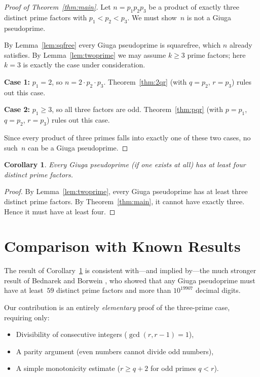 \documentclass[12pt,a4paper]{amsart}
\newtheorem{corollary}[theorem]{Corollary}
\theoremstyle{definition}
\begin{document}
\begin{proof}[Proof of Theorem~\ref{thm:main}]
Let $n = p_1 p_2 p_3$ be a product of exactly three distinct prime factors
with $p_1 < p_2 < p_3$.  We must show~$n$ is not a Giuga pseudoprime.

By Lemma~\ref{lem:sqfree} every Giuga pseudoprime is squarefree, which $n$
already satisfies.  By Lemma~\ref{lem:twoprime} we may assume $k \ge 3$ prime
factors; here $k = 3$ is exactly the case under consideration.

\textbf{Case 1:} $p_1 = 2$, so $n = 2 \cdot p_2 \cdot p_3$.
Theorem~\ref{thm:2qr} (with $q = p_2$, $r = p_3$) rules out this case.

\textbf{Case 2:} $p_1 \ge 3$, so all three factors are odd.
Theorem~\ref{thm:pqr} (with $p = p_1$, $q = p_2$, $r = p_3$) rules out
this case.

Since every product of three primes falls into exactly one of these two cases,
no such~$n$ can be a Giuga pseudoprime.
\end{proof}

\begin{corollary}
\label{cor:fourprimes}
Every Giuga pseudoprime (if one exists at all) has at least \emph{four}
distinct prime factors.
\end{corollary}

\begin{proof}
By Lemma~\ref{lem:twoprime}, every Giuga pseudoprime has at least three
distinct prime factors.  By Theorem~\ref{thm:main}, it cannot have exactly
three.  Hence it must have at least four.
\end{proof}

\section{Comparison with Known Results}

The result of Corollary~\ref{cor:fourprimes} is consistent with—and implied
by—the much stronger result of Bednarek and Borwein \cite{Bednarek2014}, who
showed that any Giuga pseudoprime must have at least~$59$ distinct prime
factors and more than $10^{19907}$ decimal digits.

Our contribution is an entirely \emph{elementary} proof of the three-prime
case, requiring only:
\begin{itemize}
  \item Divisibility of consecutive integers ($\gcd(r, r-1) = 1$),
  \item A parity argument (even numbers cannot divide odd numbers),
  \item A simple monotonicity estimate ($r \ge q + 2$ for odd primes $q < r$).
\end{itemize}
\end{document}
